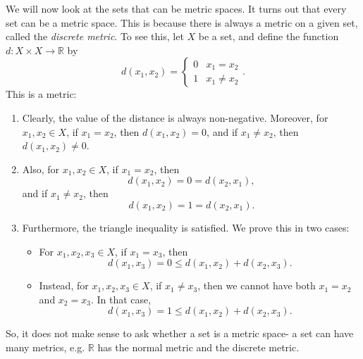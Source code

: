 \documentclass[a4paper, openany]{memoir}
\theoremstyle{definition}
\theoremstyle{plain}
\begin{document}
We will now look at the sets that can be metric spaces. It turns out that every set can be a metric space. This is because there is always a metric on a given set, called the \emph{discrete metric}. To see this, let $X$ be a set, and define the function $d: X \times X \to \mathbb{R}$ by
\[d(x_1, x_2) = \begin{cases}
0 & x_1 = x_2 \\
1 & x_1 \neq x_2
\end{cases}.\]
This is a metric:
\begin{enumerate}[label=\textbf{M\arabic*}.]
    \item Clearly, the value of the distance is always non-negative. Moreover, for $x_1, x_2 \in X$, if $x_1 = x_2$, then $d(x_1, x_2) = 0$, and if $x_1 \neq x_2$, then $d(x_1, x_2) \neq 0$. 
    \item Also, for $x_1, x_2 \in X$, if $x_1 = x_2$, then
    \[d(x_1, x_2) = 0 = d(x_2, x_1),\]
    and if $x_1 \neq x_2$, then
    \[d(x_1, x_2) = 1 = d(x_2, x_1).\]
    \item Furthermore, the triangle inequality is satisfied. We prove this in two cases:
    \begin{itemize}
        \item For $x_1, x_2, x_3 \in X$, if $x_1 = x_3$, then
        \[d(x_1, x_3) = 0 \leqslant d(x_1, x_2) + d(x_2, x_3).\]
        
        \item Instead, for $x_1, x_2, x_3 \in X$, if $x_1 \neq x_3$, then we cannot have both $x_1 = x_2$ and $x_2 = x_3$. In that case,
        \[d(x_1, x_3) = 1 \leqslant d(x_1, x_2) + d(x_2, x_3).\]
    \end{itemize}
\end{enumerate}
So, it does not make sense to ask whether a set is a metric space- a set can have many metrics, e.g. $\mathbb{R}$ has the normal metric and the discrete metric.
\end{document}
